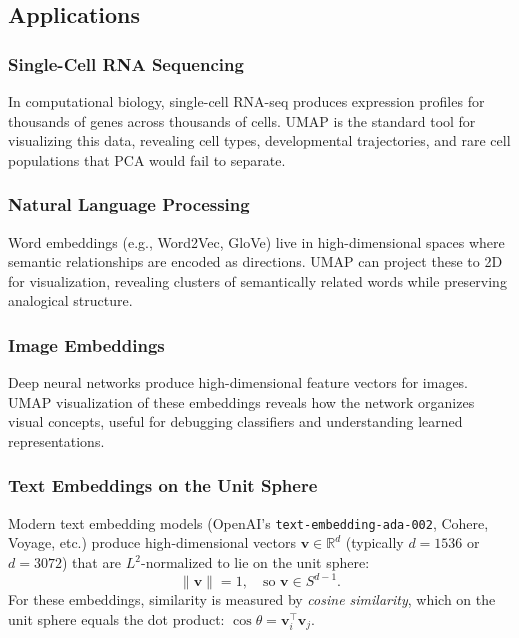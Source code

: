 \subsection{Applications}

\subsubsection{Single-Cell RNA Sequencing}
In computational biology, single-cell RNA-seq produces expression profiles for thousands of genes across thousands of cells. UMAP is the standard tool for visualizing this data, revealing cell types, developmental trajectories, and rare cell populations that PCA would fail to separate.

\subsubsection{Natural Language Processing}
Word embeddings (e.g., Word2Vec, GloVe) live in high-dimensional spaces where semantic relationships are encoded as directions. UMAP can project these to 2D for visualization, revealing clusters of semantically related words while preserving analogical structure.

\subsubsection{Image Embeddings}
Deep neural networks produce high-dimensional feature vectors for images. UMAP visualization of these embeddings reveals how the network organizes visual concepts, useful for debugging classifiers and understanding learned representations.

\subsubsection{Text Embeddings on the Unit Sphere}

Modern text embedding models (OpenAI's \texttt{text-embedding-ada-002}, Cohere, Voyage, etc.) produce high-dimensional vectors $\mathbf{v} \in \mathbb{R}^d$ (typically $d = 1536$ or $d = 3072$) that are $L^2$-normalized to lie on the unit sphere:
\[
  \|\mathbf{v}\| = 1, \quad \text{so } \mathbf{v} \in S^{d-1}.
\]
For these embeddings, similarity is measured by \emph{cosine similarity}, which on the unit sphere equals the dot product: $\cos\theta = \mathbf{v}_i^\top \mathbf{v}_j$.

